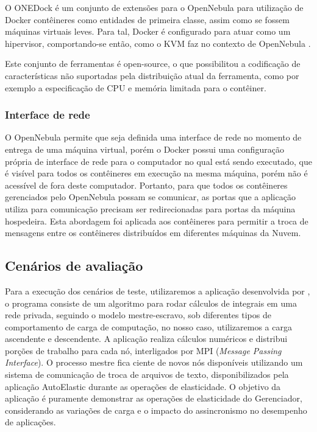 \documentclass[twoside,english,brazilian]{UNISINOSartigo}
\begin{document}
O ONEDock é um conjunto de extensões para o OpenNebula para utilização de Docker contêineres como entidades de primeira classe, assim como se fossem máquinas virtuais leves. Para tal, Docker é configurado para atuar como um hipervisor, comportando-se então, como o KVM faz no contexto de OpenNebula \cite{onedock2015}.

Este conjunto de ferramentas é open-source, o que possibilitou a codificação de características não suportadas pela distribuição atual da ferramenta, como por exemplo a especificação de CPU e memória limitada para o contêiner.

\subsubsection{Interface de rede}
O OpenNebula permite que seja definida uma interface de rede no momento de entrega de uma máquina virtual, porém o Docker possui uma configuração própria de interface de rede para o computador no qual está sendo executado, que é visível para todos os contêineres em execução na mesma máquina, porém não é acessível de fora deste computador. Portanto, para que todos os contêineres gerenciados pelo OpenNebula possam se comunicar, as portas que a aplicação utiliza para comunicação precisam ser redirecionadas para portas da máquina hospedeira. Esta abordagem foi aplicada aos contêineres para permitir a troca de mensagens entre os contêineres distribuídos em diferentes máquinas da Nuvem.

\subsection{Cenários de avaliação}
\label{cenarios}

Para a execução dos cenários de teste, utilizaremos a aplicação desenvolvida por , o programa consiste de um algoritmo para rodar cálculos de integrais em uma rede privada, seguindo o modelo mestre-escravo, sob diferentes tipos de comportamento de carga de computação, no nosso caso, utilizaremos a carga ascendente e descendente. A aplicação realiza cálculos numéricos e distribui porções de trabalho para cada nó, interligados por MPI (\textit{Message Passing Interface}). O processo mestre fica ciente de novos nós disponíveis utilizando um sistema de comunicação de troca de arquivos de texto, disponibilizados pela aplicação AutoElastic durante as operações de elasticidade. O objetivo da aplicação é puramente demonstrar as operações de elasticidade do Gerenciador, considerando as variações de carga e o impacto do assincronismo no desempenho de aplicações.
\end{document}
